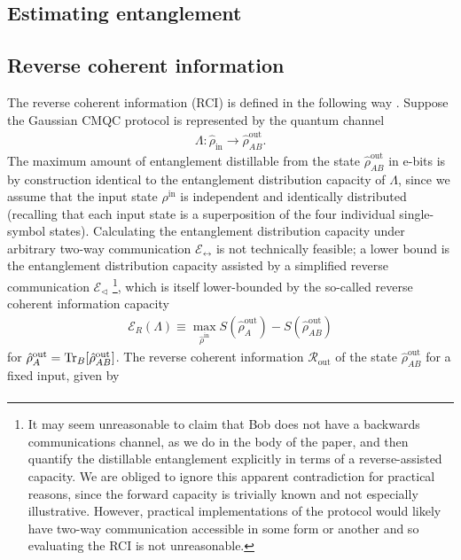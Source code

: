 \documentclass[%
 reprint,
 superscriptaddress,
 amsmath,
 amssymb,
 aps,
 pra,
]{revtex4-2}
\begin{document}
\begin{widetext}
\section{Estimating entanglement}
\label{app:ent}

\subsection{Reverse coherent information}
\label{app:ent:rci}
The reverse coherent information (RCI) is defined in the following way \cite{garcia-patron_reverse_2009}. Suppose the Gaussian CMQC protocol is represented by the quantum channel
\begin{align}
    \Lambda : \hat \rho_\mathrm{in} \rightarrow \hat \rho_{AB}^\mathrm{out}.
\end{align}
The maximum amount of entanglement distillable from the state $\hat \rho_{AB}^\mathrm{out}$ in e-bits is by construction identical to the entanglement distribution capacity of $\Lambda$, since we assume that the input state $\rho^\mathrm{in}$ is independent and identically distributed (recalling that each input state is a superposition of the four individual single-symbol states). Calculating the entanglement distribution capacity under arbitrary two-way communication $\mathcal{E}_\leftrightarrow$ is not technically feasible; a lower bound is the entanglement distribution capacity assisted by a simplified reverse communication $\mathcal{E}_\triangleleft$ \footnote{It may seem unreasonable to claim that Bob does not have a backwards communications channel, as we do in the body of the paper, and then quantify the distillable entanglement explicitly in terms of a reverse-assisted capacity. We are obliged to ignore this apparent contradiction for practical reasons, since the forward capacity is trivially known and not especially illustrative. However, practical implementations of the protocol would likely have two-way communication accessible in some form or another and so evaluating the RCI is not unreasonable.}, which is itself lower-bounded by the so-called reverse coherent information capacity
\begin{align}
    \mathcal{E}_R(\Lambda) \equiv \max_{\hat \rho^\mathrm{in}} S(\hat \rho_{A}^\mathrm{out}) - S(\hat \rho_{AB}^\mathrm{out})
\end{align}
for $\hat \rho_A^\mathrm{out} = \Tr_B[\hat \rho_{AB}^\mathrm{out}]$. The reverse coherent information $\mathcal{R}_\mathrm{out}$ of the state $\hat \rho_{AB}^\mathrm{out}$ for a fixed input, given by
\begin{align}

\end{align}
\end{widetext}
\end{document}
